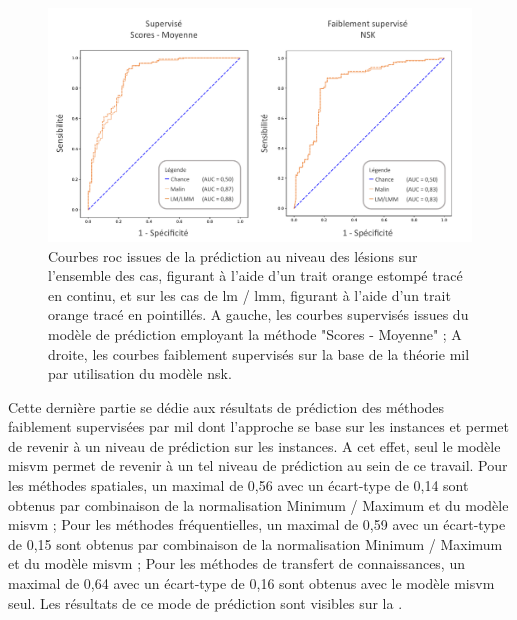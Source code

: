 \begin{figure}[H]
    \centering
    \includegraphics[width=\linewidth]{contents/chapter_6/resources/results_lesion_roc_lesions.pdf}
    \caption{Courbes \gls{roc} issues de la prédiction au niveau des lésions sur l'ensemble des cas, figurant à l'aide d'un trait orange estompé tracé en continu, et sur les cas de \gls{lm} / \gls{lmm}, figurant à l'aide d'un trait orange tracé en pointillés. A gauche, les courbes supervisés issues du modèle de prédiction employant la méthode "Scores - Moyenne" ; A droite, les courbes faiblement supervisés sur la base de la théorie \gls{mil} par utilisation du modèle \gls{nsk}.}
    \label{fig:results_lesion_roc_lesions}
\end{figure}\par

Cette dernière partie se dédie aux résultats de prédiction des méthodes faiblement supervisées par \gls{mil} dont l'approche se base sur les instances et permet de revenir à un niveau de prédiction sur les instances. A cet effet, seul le modèle \gls{misvm} permet de revenir à un tel niveau de prédiction au sein de ce travail. Pour les méthodes spatiales, un \fscore{} maximal de 0,56 avec un écart-type de 0,14 sont obtenus par combinaison de la normalisation Minimum / Maximum et du modèle \gls{misvm} ; Pour les méthodes fréquentielles, un \fscore{} maximal de 0,59 avec un écart-type de 0,15 sont obtenus par combinaison de la normalisation Minimum / Maximum et du modèle \gls{misvm} ; Pour les méthodes de transfert de connaissances, un \fscore{} maximal de 0,64 avec un écart-type de 0,16 sont obtenus avec le modèle \gls{misvm} seul. Les résultats de ce mode de prédiction sont visibles sur la .\par

